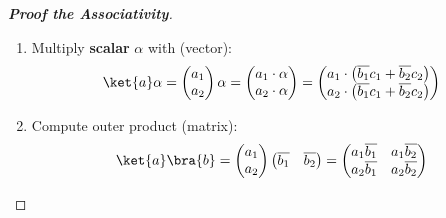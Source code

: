 \begin{proof}[\textbf{Proof the Associativity}]
\begin{enumerate}
        \item Multiply \textbf{scalar} $\alpha$ with  (vector):
        \begin{equation*}
            \ket{a}\alpha = \begin{pmatrix}
                a_{1} \\
                a_{2}
            \end{pmatrix}\alpha
            =
            \begin{pmatrix}
                a_{1} \cdot \alpha \\
                a_{2} \cdot \alpha
            \end{pmatrix}
            =
            \begin{pmatrix}
                a_{1} \cdot \left(\overline{b_{1}} c_{1} + \overline{b_{2}} c_{2}\right) \\
                a_{2} \cdot \left(\overline{b_{1}} c_{1} + \overline{b_{2}} c_{2}\right)
            \end{pmatrix}
        \end{equation*}

        \item Compute outer product  (matrix):
        \begin{equation*}
            \ket{a}\bra{b} =
            \begin{pmatrix}
                a_{1} \\
                a_{2}
            \end{pmatrix}
            \begin{pmatrix}
                \overline{b_{1}} & \overline{b_{2}}
            \end{pmatrix}
            =
            \begin{pmatrix}
                a_{1}\overline{b_{1}} & a_{1}\overline{b_{2}} \\
                a_{2}\overline{b_{1}} & a_{2}\overline{b_{2}}
            \end{pmatrix}
        \end{equation*}


\end{enumerate}
\end{proof}
